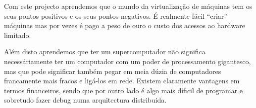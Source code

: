 \documentclass[a4paper]{article}
\begin{document}
Com este projecto aprendemos que o mundo da virtualização de máquinas tem os seus pontos positivos e os seus pontos negativos. É realmente fácil ``criar'' máquinas mas por vezes é pago a peso de ouro o custo dos acessos ao hardware limitado.

Além disto aprendemos que ter um supercomputador não significa necessáriamente ter um computador com um poder de processamento gigantesco, mas que pode significar também pegar em meia dúzia de computadores francamente mais fracos e ligá-los em rede. Existem claramente vantagens em termos financeiros, sendo que por outro lado é algo mais díficil de programar e sobretudo fazer debug numa arquitectura distribuida.
\clearpage
\end{document}
